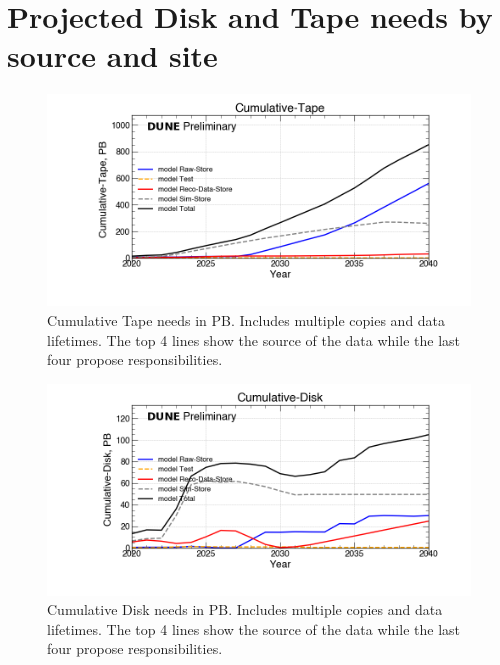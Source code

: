 \section{Projected Disk and Tape needs by source and site}
\begin{figure}[h]
\centering\includegraphics[height=0.4\textwidth]{CCB_Prep_2023-12-11-2040_noMWC/CCB_Prep_2023-12-11-2040_noMWC-Cumulative-Tape.png}
\caption{Cumulative Tape needs in PB. Includes multiple copies and data lifetimes. The top 4 lines show the source of the data while the last four propose responsibilities.}
\label{fig:Cumulative-Tape}
\end{figure}
\begin{figure}[h]
\centering\includegraphics[height=0.4\textwidth]{CCB_Prep_2023-12-11-2040_noMWC/CCB_Prep_2023-12-11-2040_noMWC-Cumulative-Disk.png}
\caption{Cumulative Disk needs in PB. Includes multiple copies and data lifetimes. The top 4 lines show the source of the data while the last four propose responsibilities.}
\label{fig:Cumulative-Disk}
\end{figure}
